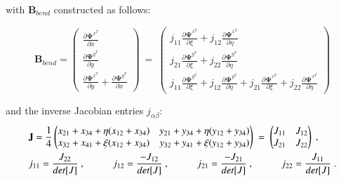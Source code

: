 with $\mathbf{B}_{bend}$ constructed as follows:

\begin{equation} 
\mathbf{B}_{bend} =
\begin{pmatrix}
\frac{\partial \mathbf{\Psi}^{x^T}}{\partial x} \\
\frac{\partial \mathbf{\Psi}^{y^T}}{\partial y} \\
\frac{\partial \mathbf{\Psi}^{x^T}}{\partial y} + \frac{\partial \mathbf{\Psi}^{y^T}}{\partial x}
\end{pmatrix}
\ =\ 
\begin{pmatrix}
j_{11} \frac{\partial \mathbf{\Psi}^{x^T}}{\partial \xi}  + j_{12} \frac{\partial \mathbf{\Psi}^{x^T}}{\partial \eta}  \\
j_{21} \frac{\partial \mathbf{\Psi}^{y^T}}{\partial \xi} + j_{22} \frac{\partial \mathbf{\Psi}^{y^T}}{\partial \eta} \\
j_{11} \frac{\partial \mathbf{\Psi}^{y^T}}{\partial \xi}  + j_{12} \frac{\partial \mathbf{\Psi}^{y^T}}{\partial \eta} + j_{21} \frac{\partial \mathbf{\Psi}^{x^T}}{\partial \xi} + j_{22} \frac{\partial \mathbf{\Psi}^{x^T}}{\partial \eta}
\end{pmatrix}
\label{equation28}
\end{equation}

and the inverse Jacobian entries $j_{\alpha \beta}$:
\begin{gather} 
	\begin{aligned}
		&\mathbf{J} = \frac{1}{4}
		\begin{pmatrix}
			x_{21} + x_{34} + \eta (x_{12} + x_{34}) & y_{21} + y_{34} + \eta (y_{12} + y_{34}) \\
			x_{32} + x_{41} + \xi (x_{12} + x_{34}) & y_{32} + y_{41} + \xi (y_{12} + y_{34})
		\end{pmatrix}
		\ = \ 
		\begin{pmatrix}
			J_{11} & J_{12} \\
			J_{21} & J_{22}
		\end{pmatrix} \ ,
	\\
		&j_{11} = \frac{J_{22}}{det[J]}\ ,
		\hspace{10mm}
		j_{12} = \frac{-J_{12}}{det[J]}\ ,
		\hspace{10mm}
		j_{21} = \frac{-J_{21}}{det[J]}\ ,
		\hspace{10mm}
		j_{22} = \frac{J_{11}}{det[J]}
		\label{equation29}\ .
	\end{aligned}
\end{gather}

